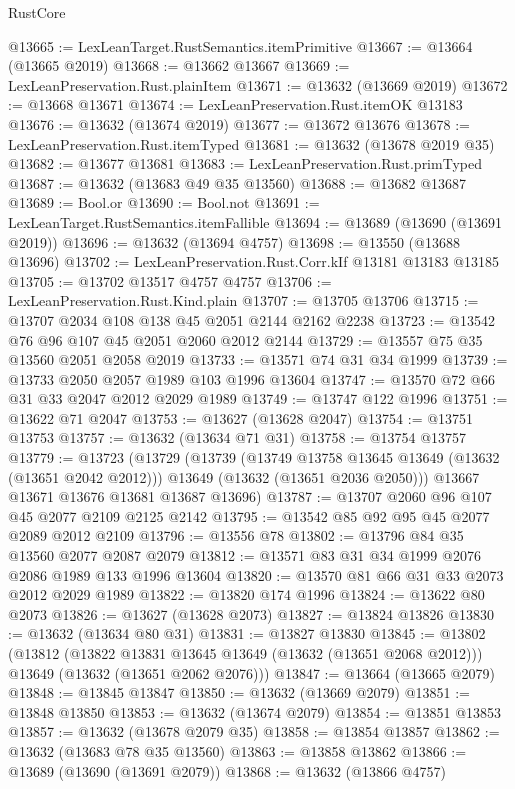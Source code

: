 \begin{lexlean}{RustCore}
\begin{coremodule}
@13665 := LexLeanTarget.RustSemantics.itemPrimitive
@13667 := @13664 (@13665 @2019)
@13668 := @13662 @13667
@13669 := LexLeanPreservation.Rust.plainItem
@13671 := @13632 (@13669 @2019)
@13672 := @13668 @13671
@13674 := LexLeanPreservation.Rust.itemOK @13183
@13676 := @13632 (@13674 @2019)
@13677 := @13672 @13676
@13678 := LexLeanPreservation.Rust.itemTyped
@13681 := @13632 (@13678 @2019 @35)
@13682 := @13677 @13681
@13683 := LexLeanPreservation.Rust.primTyped
@13687 := @13632 (@13683 @49 @35 @13560)
@13688 := @13682 @13687
@13689 := Bool.or
@13690 := Bool.not
@13691 := LexLeanTarget.RustSemantics.itemFallible
@13694 := @13689 (@13690 (@13691 @2019))
@13696 := @13632 (@13694 @4757)
@13698 := @13550 (@13688 @13696)
@13702 := LexLeanPreservation.Rust.Corr.kIf @13181 @13183 @13185
@13705 := @13702 @13517 @4757 @4757
@13706 := LexLeanPreservation.Rust.Kind.plain
@13707 := @13705 @13706
@13715 := @13707 @2034 @108 @138 @45 @2051 @2144 @2162 @2238
@13723 := @13542 @76 @96 @107 @45 @2051 @2060 @2012 @2144
@13729 := @13557 @75 @35 @13560 @2051 @2058 @2019
@13733 := @13571 @74 @31 @34 @1999
@13739 := @13733 @2050 @2057 @1989 @103 @1996 @13604
@13747 := @13570 @72 @66 @31 @33 @2047 @2012 @2029 @1989
@13749 := @13747 @122 @1996
@13751 := @13622 @71 @2047
@13753 := @13627 (@13628 @2047)
@13754 := @13751 @13753
@13757 := @13632 (@13634 @71 @31)
@13758 := @13754 @13757
@13779 := @13723
    (@13729
      (@13739
        (@13749 @13758 @13645 @13649 (@13632 (@13651 @2042 @2012)))
        @13649
        (@13632 (@13651 @2036 @2050)))
      @13667
      @13671
      @13676
      @13681
      @13687
      @13696)
@13787 := @13707 @2060 @96 @107 @45 @2077 @2109 @2125 @2142
@13795 := @13542 @85 @92 @95 @45 @2077 @2089 @2012 @2109
@13796 := @13556 @78
@13802 := @13796 @84 @35 @13560 @2077 @2087 @2079
@13812 := @13571 @83 @31 @34 @1999 @2076 @2086 @1989 @133 @1996 @13604
@13820 := @13570 @81 @66 @31 @33 @2073 @2012 @2029 @1989
@13822 := @13820 @174 @1996
@13824 := @13622 @80 @2073
@13826 := @13627 (@13628 @2073)
@13827 := @13824 @13826
@13830 := @13632 (@13634 @80 @31)
@13831 := @13827 @13830
@13845 := @13802
    (@13812
      (@13822 @13831 @13645 @13649 (@13632 (@13651 @2068 @2012)))
      @13649
      (@13632 (@13651 @2062 @2076)))
@13847 := @13664 (@13665 @2079)
@13848 := @13845 @13847
@13850 := @13632 (@13669 @2079)
@13851 := @13848 @13850
@13853 := @13632 (@13674 @2079)
@13854 := @13851 @13853
@13857 := @13632 (@13678 @2079 @35)
@13858 := @13854 @13857
@13862 := @13632 (@13683 @78 @35 @13560)
@13863 := @13858 @13862
@13866 := @13689 (@13690 (@13691 @2079))
@13868 := @13632 (@13866 @4757)

\end{coremodule}
\end{lexlean}
